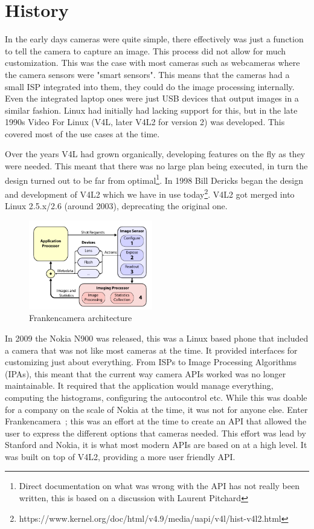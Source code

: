 \section{History}
In the early days cameras were quite simple, there effectively was just a
function to tell the camera to capture an image. This process did not allow for
much customization. This was the case with most cameras such as webcameras where
the camera sensors were "smart sensors". This means that the cameras had a
small ISP integrated into them, they could do the image processing internally. Even
the integrated laptop ones were just USB devices that output images in a
similar fashion. Linux had initially had lacking support for this, but in the
late 1990s Video For Linux (V4L, later V4L2 for version 2) was developed. This
covered most of the use cases at the time.

Over the years V4L had grown organically, developing features on the fly as
they were needed. This meant that there was no large plan being executed, in
turn the design turned out to be far from optimal\footnote{Direct documentation
on what was wrong with the API has not really been written, this is based
on a discussion with Laurent Pitchard}. In 1998 Bill Dericks began the
design and development of V4L2 which we have in use today\footnote{https://www.kernel.org/doc/html/v4.9/media/uapi/v4l/hist-v4l2.html}.
V4L2 got merged into Linux 2.5.x/2.6 (around 2003), deprecating the
original one.

\begin{figure}
    \centering
    \includegraphics[width=0.48\textwidth]{figures/fcam_arch.png}
    \caption{Frankencamera architecture~\cite{adams2010frankencamera}}
    \label{fig:fcam_api}
\end{figure}

In 2009 the Nokia N900 was released, this was a Linux based phone that included a camera that was not
like most cameras at the time. It provided interfaces for customizing just
about everything. From ISPs to Image Processing Algorithms (IPAs), this meant
that the current way camera APIs worked was no longer maintainable. It
required that the application would manage everything, computing the
histograms, configuring the autocontrol etc. While this was doable for a
company on the scale of Nokia at the time, it was not for anyone else. Enter
Frankencamera~\cite{adams2010frankencamera}; this was an effort at the time
to create an API that allowed the user to express the different options that
cameras needed. This effort was lead by Stanford and Nokia, it is what most
modern APIs are based on at a high level. It was built on top of V4L2,
providing a more user friendly API.

